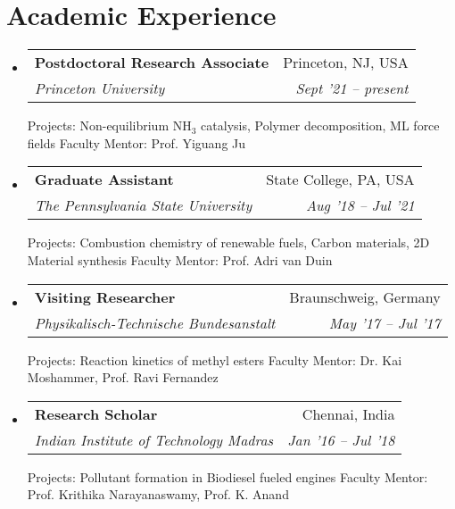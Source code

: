\documentclass[letterpaper,10pt]{article}
\makeatletter
\newcommand{\resumeSubheading}[4]{
	\vspace{-1pt}\item
	\begin{tabular*}{0.97\textwidth}{l@{\extracolsep{\fill}}r}
		\textbf{#1} & #2 \\
		\textit{\small#3} & \textit{\small #4} \\
	\end{tabular*}\vspace{-5pt}
}
\newcommand{\resumeSubHeadingListStart}{\begin{itemize}[leftmargin=*]}
\newcommand{\resumeSubHeadingListEnd}{\end{itemize}}
\makeatother
\begin{document}
	\section{Academic Experience}
\resumeSubHeadingListStart
\resumeSubheading
{Postdoctoral Research Associate}{Princeton, NJ, USA}
{Princeton University}{Sept '21 -- present}

{Projects: Non-equilibrium NH$_3$ catalysis, Polymer decomposition, ML force fields}
\newline
{Faculty Mentor: Prof. Yiguang Ju}

\resumeSubheading
{Graduate Assistant}{State College, PA, USA}
{The Pennsylvania State University}{Aug '18 -- Jul '21}

{Projects: Combustion chemistry of renewable fuels, Carbon materials, 2D Material synthesis}
\newline
{Faculty Mentor: Prof. Adri van Duin}

\resumeSubheading
{Visiting Researcher}{Braunschweig, Germany}
{Physikalisch-Technische Bundesanstalt}{May '17 -- Jul '17}

{Projects: Reaction kinetics of methyl esters}
\newline
{Faculty Mentor: Dr. Kai Moshammer, Prof. Ravi Fernandez}

\resumeSubheading
{Research Scholar}{Chennai, India}
{Indian Institute of Technology Madras}{Jan '16 -- Jul '18}

{Projects: Pollutant formation in Biodiesel fueled engines}
\newline
{Faculty Mentor: Prof. Krithika Narayanaswamy, Prof. K. Anand}

\resumeSubHeadingListEnd	
	

	
\end{document}
